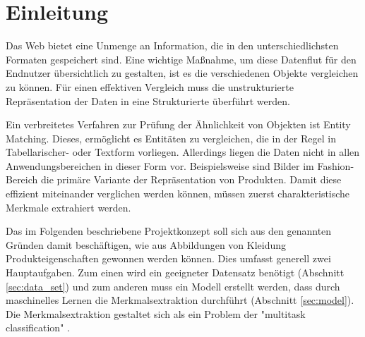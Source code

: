 \section{Einleitung} \label{sec:intro}

Das Web bietet eine Unmenge an Information, die in den unterschiedlichsten Formaten gespeichert sind. Eine wichtige Maßnahme, um diese Datenflut für den Endnutzer übersichtlich zu gestalten, ist es die verschiedenen Objekte vergleichen zu können. Für einen effektiven Vergleich muss die unstrukturierte Repräsentation der Daten in eine Strukturierte überführt werden.

Ein verbreitetes Verfahren zur Prüfung der Ähnlichkeit von Objekten ist Entity Matching. Dieses, ermöglicht es Entitäten zu vergleichen, die in der Regel in Tabellarischer- oder Textform vorliegen. Allerdings liegen die Daten nicht in allen Anwendungsbereichen in dieser Form vor. Beispielsweise sind Bilder im Fashion-Bereich die primäre Variante der Repräsentation von Produkten. Damit diese effizient miteinander verglichen werden können, müssen zuerst charakteristische Merkmale extrahiert werden.

Das im Folgenden beschriebene Projektkonzept soll sich aus den genannten Gründen damit beschäftigen, wie aus Abbildungen von Kleidung Produkteigenschaften gewonnen werden können. Dies umfasst generell zwei Hauptaufgaben. Zum einen wird ein geeigneter Datensatz benötigt (Abschnitt \ref{sec:data_set}) und zum anderen muss ein Modell erstellt werden, dass durch maschinelles Lernen die Merkmalsextraktion durchführt (Abschnitt \ref{sec:model}). Die Merkmalsextraktion gestaltet sich als ein Problem der "multitask classification" \cite{scikit-learn}.